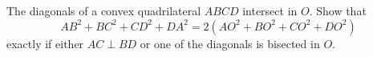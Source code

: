 The diagonals of a convex quadrilateral $ABCD$ intersect in $O$. Show that
\[ AB^2 + BC^2 + CD^2 + DA^2 = 2\left(AO^2 + BO^2 + CO^2 + DO^2\right) \]
exactly if either $AC \perp BD$ or one of the diagonals is bisected in $O$.
